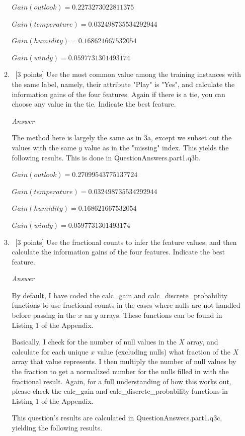 \documentclass[12pt, fullpage,letterpaper]{article}
\begin{document}
\begin{enumerate}
\begin{enumerate}
\vspace{5mm}

$Gain(outlook)=0.2273273022811375$

$Gain(temperature)=0.032498735534292944$

$Gain(humidity)=0.168621667532054$

$Gain(windy)=0.0597731301493174$

\item~[3 points] Use the most common value among the  training instances with the same label, namely, their attribute "Play" is "Yes", and calculate the information gains of the four features. Again if there is a tie, you can choose any value in the tie. Indicate the best feature.

\emph{Answer}

The method here is largely the same as in 3a, except we subset out the values with the same $y$ value as in the "missing" index. This yields the following results. This is done in QuestionAnswers.part1.q3b.

\vspace{5mm}

$Gain(outlook)=0.27099543775137724$

$Gain(temperature)=0.032498735534292944$

$Gain(humidity)=0.168621667532054$

$Gain(windy)=0.0597731301493174$

\item~[3 points] Use the fractional counts to infer the feature values, and then calculate the information gains of the four features. Indicate the best feature.

\emph{Answer}

By default, I have coded the calc\_gain and calc\_discrete\_probability functions to use fractional counts in the cases where nulls are not handled before passing in the $x$ an $y$ arrays. These functions can be found in Listing 1 of the Appendix. 

Basically, I check for the number of null values in the $X$ array, and calculate for each unique $x$ value (excluding nulls) what fraction of the $X$ array that value represents. I then multiply the number of null values by the fraction to get a normalized number for the nulls filled in with the fractional result. Again, for a full understanding of how this works out, please check the calc\_gain and calc\_discrete\_probability functions  in Listing 1 of the Appendix.

This question's results are calculated in QuestionAnswers.part1.q3c, yielding the following results.


\end{enumerate}
\end{enumerate}
\end{document}
